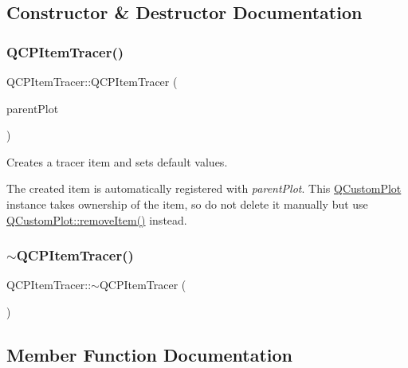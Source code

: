 \subsection{Constructor \& Destructor Documentation}
\mbox{\label{class_q_c_p_item_tracer_adc5ca846eeac323db4aa1fc4081e36be}} 
\subsubsection{\texorpdfstring{QCPItemTracer()}{QCPItemTracer()}}
{\footnotesize\ttfamily Q\+C\+P\+Item\+Tracer\+::\+Q\+C\+P\+Item\+Tracer (\begin{DoxyParamCaption}\item[{\mbox{\hyperlink{class_q_custom_plot}{Q\+Custom\+Plot}} $\ast$}]{parent\+Plot }\end{DoxyParamCaption})\hspace{0.3cm}{\ttfamily [explicit]}}

Creates a tracer item and sets default values.

The created item is automatically registered with {\itshape parent\+Plot}. This \mbox{\hyperlink{class_q_custom_plot}{Q\+Custom\+Plot}} instance takes ownership of the item, so do not delete it manually but use \mbox{\hyperlink{class_q_custom_plot_ae04446557292551e8fb6e2c106e1848d}{Q\+Custom\+Plot\+::remove\+Item()}} instead. \mbox{\label{class_q_c_p_item_tracer_a43686565a9b70815915618636b9bdf0f}} 
\subsubsection{\texorpdfstring{$\sim$QCPItemTracer()}{~QCPItemTracer()}}
{\footnotesize\ttfamily Q\+C\+P\+Item\+Tracer\+::$\sim$\+Q\+C\+P\+Item\+Tracer (\begin{DoxyParamCaption}{ }\end{DoxyParamCaption})\hspace{0.3cm}{\ttfamily [virtual]}}



\subsection{Member Function Documentation}
\mbox{\label{class_q_c_p_item_tracer_a6dd4660e70f58bb00390bcda56be568d}} 
